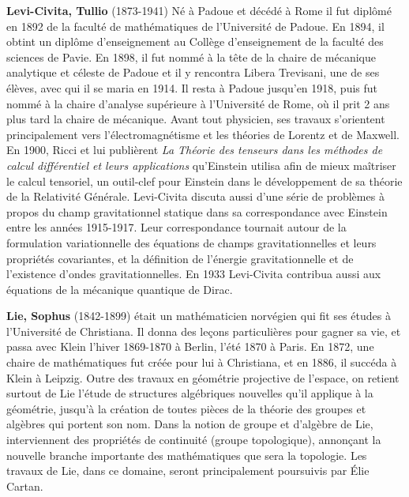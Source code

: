 \textbf{Levi-Civita, Tullio} (1873-1941) Né à Padoue et décédé à Rome il fut diplômé en 1892 de la faculté de mathématiques de l'Université de Padoue. En 1894, il obtint un diplôme d'enseignement au Collège d'enseignement de la faculté des sciences de Pavie. En 1898, il fut nommé à la tête de la chaire de mécanique analytique et céleste de Padoue et il y rencontra Libera Trevisani, une de ses élèves, avec qui il se maria en 1914. Il resta à Padoue jusqu'en 1918, puis fut nommé à la chaire d'analyse supérieure à l'Université de Rome, où il prit 2 ans plus tard la chaire de mécanique. Avant tout physicien, ses travaux s'orientent principalement vers l'électromagnétisme et les théories de Lorentz et de Maxwell. En 1900, Ricci et lui publièrent \textit{La Théorie des tenseurs dans les méthodes de calcul différentiel et leurs applications} qu'Einstein utilisa afin de mieux maîtriser le calcul tensoriel, un outil-clef pour Einstein dans le développement de sa théorie de la Relativité Générale. Levi-Civita discuta aussi d'une série de problèmes à propos du champ gravitationnel statique dans sa correspondance avec Einstein entre les années 1915-1917. Leur correspondance tournait autour de la formulation variationnelle des équations de champs gravitationnelles et leurs propriétés covariantes, et la définition de l'énergie gravitationnelle et de l'existence d'ondes gravitationnelles. En 1933 Levi-Civita contribua aussi aux équations de la mécanique quantique de Dirac.

\textbf{Lie, Sophus} (1842-1899) était un mathématicien norvégien qui fit ses études à l'Université de Christiana. Il donna des leçons particulières pour gagner sa vie, et passa avec Klein l'hiver 1869-1870 à Berlin, l'été 1870 à Paris. En 1872, une chaire de mathématiques fut créée pour lui à Christiana, et en 1886, il succéda à Klein à Leipzig. Outre des travaux en géométrie projective de l'espace, on retient surtout de Lie l'étude de structures algébriques nouvelles qu'il applique à la géométrie, jusqu'à la création de toutes pièces de la théorie des groupes et algèbres qui portent son nom. Dans la notion de groupe et d'algèbre de Lie, interviennent des propriétés de continuité (groupe topologique), annonçant la nouvelle branche importante des mathématiques que sera la topologie. Les travaux de Lie, dans ce domaine, seront principalement poursuivis par Élie Cartan.


